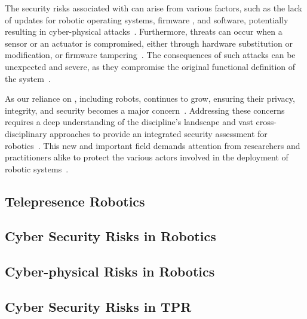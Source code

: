 The security risks associated with  can arise from various factors, such as the lack of updates for robotic operating systems,
firmware
, and software, potentially resulting in cyber-physical attacks~\cite[120]{robotics_cyber_security_2022}. Furthermore,  threats can occur when a sensor or an actuator is compromised, either through hardware substitution or modification, or firmware tampering~\cite[78]{cyber_sec_robotics_privacy_safety_2017}. The consequences of such attacks can be unexpected and severe, as they compromise the original functional definition of the system~\cite[78]{cyber_sec_robotics_privacy_safety_2017}.

As our reliance on , including robots, continues to grow, ensuring their privacy, integrity, and security becomes a major concern~\cite[17]{robot_security_framework_2018}. Addressing these concerns requires a deep understanding of the discipline's landscape and vast cross-disciplinary approaches to provide an integrated security assessment for robotics~\cite[17]{robot_security_framework_2018}. This new and important field demands attention from researchers and practitioners alike to protect the various actors involved in the deployment of robotic systems~\cite[78]{cyber_sec_robotics_privacy_safety_2017}.

\subsection{Telepresence Robotics}


\subsection{Cyber Security Risks in Robotics}


\subsection{Cyber-physical Risks in Robotics}


\subsection{Cyber Security Risks in \ac{TPR}}




